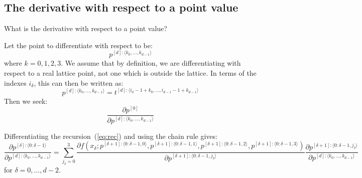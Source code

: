 \documentclass[11pt]{article}
\begin{document}

\subsection{The derivative with respect to a point value}


What is the derivative with respect to a point value? 

Let the point to differentiate with respect to be:
\begin{equation}
p^{[d]: \langle k_0, \dots, k_{d-1} \rangle}
\end{equation}
where $k=0,1,2,3$. We assume that by definition, we are differentiating with respect to a real lattice point, not one which is outside the lattice. In terms of the indexes $i_\delta$, this can then be written as:
\begin{equation}
p^{[d]: \langle k_0, \dots, k_{d-1} \rangle} = t^{[d]: \langle i_0-1+k_0, \dots, i_{d-1}-1+k_{d-1} \rangle}
\end{equation}
Then we seek:
\begin{equation}
\frac{\partial p^{[0]}}{\partial p^{[d]: \langle k_0, \dots, k_{d-1} \rangle}}
\end{equation}

Differentiating the recursion~(\ref{eq:rec}) and using the chain rule gives:
\begin{equation}
\frac{\partial p^{[\delta]: \langle 0:\delta-1 \rangle} }{\partial p^{[d]: \langle k_0, \dots, k_{d-1} \rangle}} = \sum_{j_\delta=0}^3 
\frac{ \partial f \left ( 
x_{\delta} ; 
p^{[\delta+1]: \langle 0:\delta-1,0 \rangle},
p^{[\delta+1]: \langle 0:\delta-1,1 \rangle},
p^{[\delta+1]: \langle 0:\delta-1,2 \rangle},
p^{[\delta+1]: \langle 0:\delta-1,3 \rangle}
\right ) 
}{
\partial p^{[\delta+1]: \langle 0:\delta-1,j_\delta \rangle}
}
\frac{\partial p^{[\delta+1]: \langle 0:\delta-1,j_\delta \rangle}
}{
\partial p^{[d]: \langle k_0, \dots, k_{d-1} \rangle}
}
\end{equation}
for $\delta = 0,\dots,d-2$.
\end{document}
